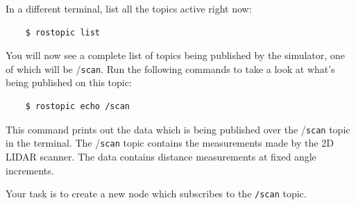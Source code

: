 \documentclass[letta4 paper]{article}
\numberwithin{equation}{section}
\newcommand{\0}{\mathbf{0}}
\begin{document}
	In a different terminal, list all the topics active right now:
	
	\begin{lstlisting}
	$ rostopic list
	\end{lstlisting}
	
	You will now see a complete list of topics being published by the simulator, one of which will be /\texttt{scan}. Run the following commands to take a look at what's being published on this topic:
	
	\begin{lstlisting}
	$ rostopic echo /scan
	\end{lstlisting}
	
	This command prints out the data which is being published over the /\texttt{scan} topic in the terminal. The /\texttt{scan} topic contains the measurements made by the 2D LIDAR scanner. The data contains distance measurements at fixed angle increments.

	Your task is to create a new node which subscribes to the \texttt{/scan} topic.
	
\end{document}
